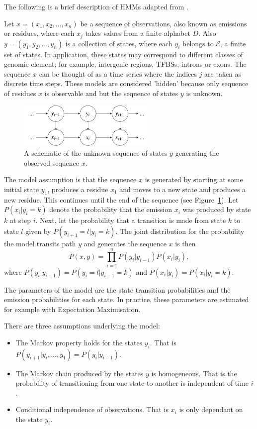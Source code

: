 The following is a brief description of HMMs adapted from \cite{mesa2016hidden}. 

Let $x = (x_1,x_2,\ldots,x_n)$ be a sequence of observations, also known as emissions or residues, where each $x_j$ takes values from a finite alphabet $D$. 
Also $y = (y_1,y_2,\ldots,y_n)$ is a collection of states, where each $y_i$ belongs to $\mathcal{E}$, a finite set of states. In application, these states may correspond to different classes of genomic element; for example, intergenic regions, TFBSs, introns or exons. The sequence $x$ can be thought of as a time series where the indices $j$ are taken as discrete time steps. These models are considered 'hidden' because only sequence of residues $x$ is observable and but the sequence of states $y$ is unknown.
 
    \begin{figure}[H]
        \centering
        \includegraphics[width=0.6\textwidth]{HMM.pdf}
        \caption{A schematic of the unknown sequence of states $y$ generating the observed sequence $x$.}
        \label{fig:HMM}
    \end{figure}
The model assumption is that the sequence $x$ is generated by starting at some initial state $y_1$, produces a residue $x_1$ and moves to a new state and produces a new residue. This continues until the end of the sequence (see Figure~\ref{fig:HMM}). Let $P(x_i|y_i = k)$ denote the probability that the emission $x_i$ was produced by state $k$ at step $i$. Next, let the probability that a transition is made from state $k$ to state $l$ given by $P(y_{i+1} = l | y_i = k)$. The joint distribution for the probability the model transits path $y$ and generates the sequence $x$ is then
	\begin{equation}
		P(x,y) = \prod_{i=1}^{n} P(y_i|y_{i-1})P(x_i|y_i),
	\end{equation}
where $P(y_i|y_{i-1}) = P(y_{i} = l | y_{i-1} = k)$ and $P(x_i|y_i) = P(x_i|y_i = k)$. 

The parameters of the model are the state transition probabilities and the emission probabilities for each state. In practice, these parameters are estimated for example with Expectation Maximisation.

There are three assumptions underlying the model:
	\begin{itemize}
		\item The Markov property holds for the states $y_i$. That is $P(y_{i+1}|y_i,\ldots,y_1) = P(y_i|y_{i-1})$.
		\item The Markov chain produced by the states $y$ is homogeneous. That is the probability of transitioning from one state to another is independent of time $i$. 
		\item Conditional independence of observations. That is $x_i$ is only dependant on the state $y_i$. 
	\end{itemize}

